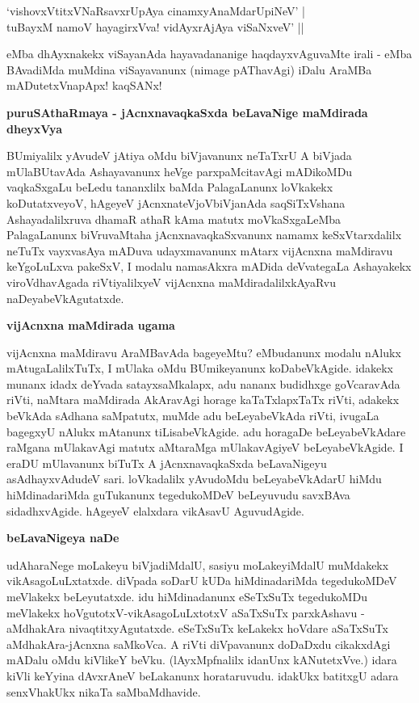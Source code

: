 \begin{shloka}
`vishovxVtitxVNaRsavxrUpAya cinamxyAnaMdarUpiNeV' |\\\label{65}
tuBayxM namoV hayagirxVva! vidAyxrAjAya viSaNxveV' ||
\end{shloka}

\noindent
eMba dhAyxnakekx viSayanAda hayavadananige haqdayxvAguvaMte irali - eMba BAvadiMda muMdina viSayavanunx (nimage pAThavAgi) iDalu AraMBa mADutetxVnapApx! kaqSANx!

{\bigskip
\noindent
{\large\bf puruSAthaRmaya - jAcnxnavaqkaSxda beLavaNige maMdirada dheyxVya}}\label{page65}
\medskip

\noindent
BUmiyalilx yAvudeV jAtiya oMdu biVjavanunx neTaTxrU A biVjada mUla\-BUtavAda Ashaya\-vanunx heVge parxpaMcitavAgi mADikoMDu vaqkaSxgaLu beLedu tananxlilx baMda PalagaLanunx loVkakekx koDu\-tatxveyoV, hAgeyeV jAcnxnateVjoVbiVjanAda saqSiTxVshana Ashayadalilxruva dhamaR athaR kAma matutx moVkaSxgaLeMba Pala\-gaLanunx biVruvaMtaha jAcnxnavaqkaSxvanunx namamx keSxVtarxdalilx neTuTx vayxvasAya mADuva udayx\-ma\-vanunx mAtarx vijAcnxna maMdiravu keYgoLuLxva pakeSxV, I modalu namasAkxra \hbox{mADida} deVvategaLa Ashayakekx viroVdha\-vAgada riVtiyalilxyeV vijAcnxna maMdiradalilx\break \hbox{kAyaRvu} naDeyabeVkAgutatxde.

{\bigskip
\noindent
{\large\bf vijAcnxna maMdirada ugama}}
\medskip

\noindent
vijAcnxna maMdiravu AraMBavAda bageyeMtu? eMbudanunx modalu nAlukx mAtu\-gaLa\-lilxTuTx, I mU\-laka oMdu BUmikeyanunx koDabeVkAgide. idakekx munanx idadx deYvada satayx\-saMkalapx, adu nananx budidhxge\- goVcara\-vAda riVti, naMtara maMdirada AkAravAgi horage kaTaTxlapxTaTx riVti, adakekx beVkAda sAdhana saM\-patutx, muMde adu beLeyabeVkAda riVti, ivugaLa bagegxyU nAlukx mAtanunx tiLisabeVkAgide. adu horagaDe beLeyabeVkAdare raMgana mUlakavAgi matutx aMta\-raMga mUlakavAgiyeV beLeyabeVkAgide. I eraDU mUlavanunx biTuTx A jAcnxnavaqkaSxda beLavaNigeyu asAdhayxvAdudeV sari. loVkadalilx yAvu\-doMdu beLeyabeVkAdarU hiMdu hiMdinadariMda guTukanunx tegedukoMDeV beLeyuvudu savxBAva sidadhxvAgide. hAgeyeV elalx\-dara vikAsavU AguvudAgide.

{\bigskip
\noindent
{\large\bf beLavaNigeya naDe}}\label{page66}
\medskip

\noindent
udAharaNege moLakeyu biVjadiMdalU, sasiyu moLakeyiMdalU muMdakekx vikAsa\-goLuLxtatxde. diV\-pada soDarU kUDa hiMdinadariMda tegedukoMDeV meVlakekx beLeyutatxde. idu hiMdinadanunx eSeTx\-SuTx tegedukoMDu meVlakekx hoVgutotxV-vikAsagoLuLxtotxV aSaTxSuTx parxkAshavu - aMdhakAra nivaqtitx\-yAgutatxde. eSeTxSuTx keLakekx hoVdare aSaTxSuTx aMdhakAra-jAcnxna saMkoVca. A riVti diVpavanunx doDaDxdu cikakx\-dAgi mA\-Dalu oMdu kiVlikeY beVku. (lAyxMpfnalilx idanUnx kANutetxVve.) idara kiVli keYyina dAvxrAneV beLakanunx horataruvudu. idakUkx batitxgU adara senxVhakUkx nikaTa saMbaMdhavide.

